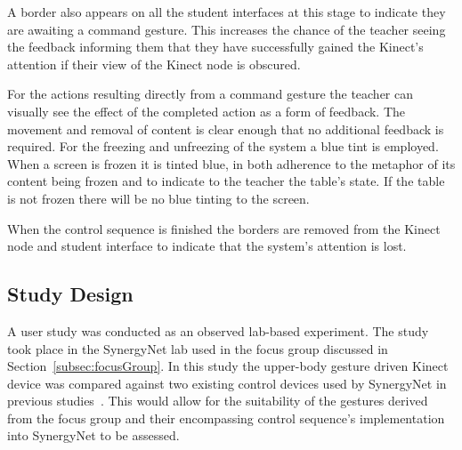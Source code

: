 \documentclass[link]{IWCOMP}
\begin{document}
A border also appears on all the student interfaces at this stage to indicate they are awaiting a command gesture.
This increases the chance of the teacher seeing the feedback informing them that they have successfully gained the Kinect's attention if their view of the Kinect node is obscured.

For the actions resulting directly from a command gesture the teacher can visually see the effect of the completed action as a form of feedback.
The movement and removal of content is clear enough that no additional feedback is required.
For the freezing and unfreezing of the system a blue tint is employed.
When a screen is frozen it is tinted blue, in both adherence to the metaphor of its content being frozen and to indicate to the teacher the table's state.
If the table is not frozen there will be no blue tinting to the screen.

When the control sequence is finished the borders are removed from the Kinect node and student interface to indicate that the system's attention is lost.

\subsection{Study Design}
\label{subsec:studyPhase1Design}


A user study was conducted as an observed lab-based experiment.
The study took place in the SynergyNet lab used in the focus group discussed in Section~\ref{subsec:focusGroup}.
In this study the upper-body gesture driven Kinect device was compared against two existing control devices used by SynergyNet in previous studies~\cite{Mercier2012}.
This would allow for the suitability of the gestures derived from the focus group and their encompassing control sequence's implementation into SynergyNet to be assessed.
\end{document}
